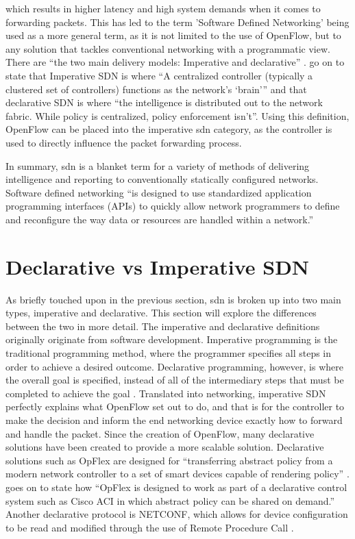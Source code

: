 which results in higher latency and high system demands when it comes to
forwarding packets. This has led to the term 'Software Defined Networking'
being used as a more general term, as it is not limited to the use of OpenFlow,
but to any solution that tackles conventional networking with a programmatic
view. There are ``the two main
delivery models: Imperative and declarative''
\citet{10}. \citet{10} go on to
state that Imperative SDN is
where ``A
centralized controller (typically a clustered set of controllers)
functions as
the network’s ‘brain’'' and that declarative SDN is where
``the intelligence is
distributed out to the network fabric. While policy is
centralized, policy
enforcement isn’t''. Using this definition, OpenFlow can be placed into the
imperative \gls{sdn} category, as the controller is used to directly influence
the packet forwarding process.

In summary, \gls{sdn} is a blanket term for a
variety of methods of delivering intelligence and reporting to conventionally
statically configured networks. Software
defined networking “is designed to use
standardized application programming
interfaces (APIs) to quickly allow network
programmers to define and
reconfigure the way data or resources are handled
within a network.” \citep{9}

\section{Declarative vs Imperative SDN}
\label{litreview:declarativevsimperative}
As briefly touched upon in the
previous section, \gls{sdn} is broken up into two main types, imperative and
declarative. This section will explore the differences between the two in more
detail. The imperative and declarative definitions originally originate from
software development. Imperative programming is the traditional programming
method, where the programmer specifies all steps in order to achieve a desired
outcome. Declarative programming, however, is where the overall goal is
specified, instead of all of the intermediary steps that must be completed to
achieve the goal  \citep{LATIF2020102563}. Translated into networking,
imperative SDN perfectly explains what OpenFlow set out to do, and that is for
the controller to make the decision and inform the end networking device
exactly how to forward and handle the packet. Since the creation of OpenFlow,
many declarative solutions have been created to provide a more scalable
solution. Declarative solutions such as OpFlex are designed for ``transferring
abstract policy from a modern network controller to a set of smart devices
capable of rendering policy'' \citep{bhardwaj_2020}. \citeauthor{bhardwaj_2020}
goes on to state how ``OpFlex is designed to work as part of a declarative
control system such as Cisco ACI in which abstract policy can be shared on
demand.'' Another declarative protocol is NETCONF, which allows for device
configuration to be read and modified through the use of Remote Procedure Call
\citep{LATIF2020102563}.

